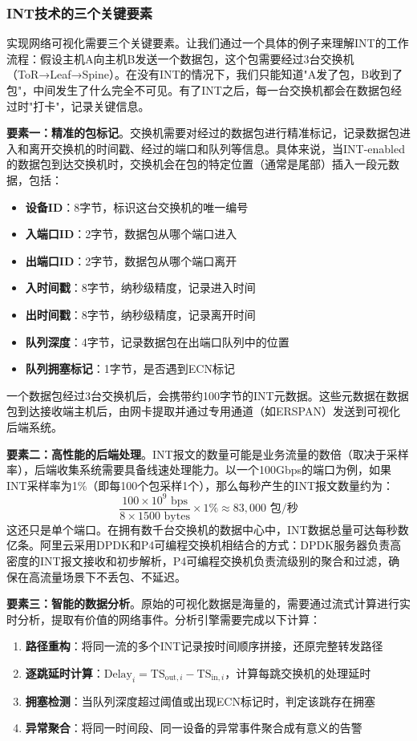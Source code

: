 \subsubsection{INT技术的三个关键要素}

实现网络可视化需要三个关键要素。让我们通过一个具体的例子来理解INT的工作流程：假设主机A向主机B发送一个数据包，这个包需要经过3台交换机（ToR→Leaf→Spine）。在没有INT的情况下，我们只能知道"A发了包，B收到了包"，中间发生了什么完全不可见。有了INT之后，每一台交换机都会在数据包经过时"打卡"，记录关键信息。

\textbf{要素一：精准的包标记}。交换机需要对经过的数据包进行精准标记，记录数据包进入和离开交换机的时间戳、经过的端口和队列等信息。具体来说，当INT-enabled的数据包到达交换机时，交换机会在包的特定位置（通常是尾部）插入一段元数据，包括：
\begin{itemize}
    \item \textbf{设备ID}：8字节，标识这台交换机的唯一编号
    \item \textbf{入端口ID}：2字节，数据包从哪个端口进入
    \item \textbf{出端口ID}：2字节，数据包从哪个端口离开
    \item \textbf{入时间戳}：8字节，纳秒级精度，记录进入时间
    \item \textbf{出时间戳}：8字节，纳秒级精度，记录离开时间
    \item \textbf{队列深度}：4字节，记录数据包在出端口队列中的位置
    \item \textbf{队列拥塞标记}：1字节，是否遇到ECN标记
\end{itemize}

一个数据包经过3台交换机后，会携带约100字节的INT元数据。这些元数据在数据包到达接收端主机后，由网卡提取并通过专用通道（如ERSPAN）发送到可视化后端系统。

\textbf{要素二：高性能的后端处理}。INT报文的数量可能是业务流量的数倍（取决于采样率），后端收集系统需要具备线速处理能力。以一个100Gbps的端口为例，如果INT采样率为1\%（即每100个包采样1个），那么每秒产生的INT报文数量约为：
\[
\frac{100 \times 10^9 \text{ bps}}{8 \times 1500 \text{ bytes}} \times 1\% \approx 83,000 \text{ 包/秒}
\]
这还只是单个端口。在拥有数千台交换机的数据中心中，INT数据总量可达每秒数亿条。阿里云采用DPDK和P4可编程交换机相结合的方式：DPDK服务器负责高密度的INT报文接收和初步解析，P4可编程交换机负责流级别的聚合和过滤，确保在高流量场景下不丢包、不延迟。

\textbf{要素三：智能的数据分析}。原始的可视化数据是海量的，需要通过流式计算进行实时分析，提取有价值的网络事件。分析引擎需要完成以下计算：
\begin{enumerate}
    \item \textbf{路径重构}：将同一流的多个INT记录按时间顺序拼接，还原完整转发路径
    \item \textbf{逐跳延时计算}：$\text{Delay}_i = \text{TS}_{\text{out},i} - \text{TS}_{\text{in},i}$，计算每跳交换机的处理延时
    \item \textbf{拥塞检测}：当队列深度超过阈值或出现ECN标记时，判定该跳存在拥塞
    \item \textbf{异常聚合}：将同一时间段、同一设备的异常事件聚合成有意义的告警
\end{enumerate}

